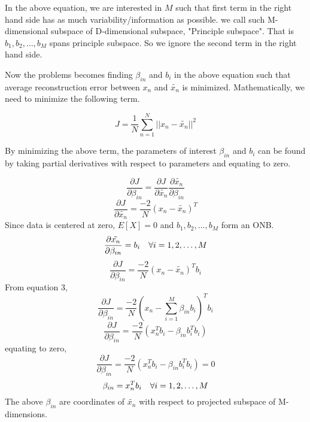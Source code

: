 \documentclass[11pt]{article}
\begin{document}
In the above equation, we are interested in $M$ such that first term in the right hand side has as much variability/information as possible.
we call such M-dimensional subspace of D-dimensional subspace, "Principle subspace". That is ${b_1, b_2, \dots, b_M}$ spans principle subspace. So we ignore the second term in the right hand side.

Now the problems becomes finding $\beta_{in}$ and $b_i$ in the above equation such that average reconstruction error between $x_n$ and $\tilde{x_n}$ is minimized.
Mathematically, we need to minimize the following term.

\begin{equation}
    J = \frac{1}{N} \sum_{n=1}^{N} ||x_n-\tilde{x_n}||^2 
\end{equation}

By minimizing the above term, the parameters of interest $\beta_{in}$ and $b_i$ can be found by taking partial derivatives with respect to parameters and equating to zero.

$$\frac{\partial{J}}{{\partial{\beta_{in}}}} = \frac{\partial{J}}{{\partial{\tilde{x_n}}}} \frac{\partial{\tilde{x_n}}}{{\partial{\beta_{in}}}}$$
$$\frac{\partial{J}}{{\partial{\tilde{x_n}}}} = \frac{-2}{N}(x_n-\tilde{x_n})^T$$
Since data is centered at zero, $E[X] = 0$ and $b_1, b_2, \dots, b_M$ form an ONB.
$$\frac{\partial{\tilde{x_n}}}{{\partial{\beta_{in}}}} = b_i \hspace{10px} \forall i =1,2,\dots,M $$
$$\frac{\partial{J}}{{\partial{\beta_{in}}}} = \frac{-2}{N}(x_n-\tilde{x_n})^T b_i$$
From equation 3,
$$\frac{\partial{J}}{{\partial{\beta_{in}}}} = \frac{-2}{N}(x_n-\sum_{i=1}^{M}\beta_{in}b_i)^T b_i$$
$$\frac{\partial{J}}{{\partial{\beta_{in}}}} = \frac{-2}{N}(x_n^Tb_i-\beta_{in}b_i^Tb_i)$$
equating to zero,
$$\frac{\partial{J}}{{\partial{\beta_{in}}}} = \frac{-2}{N}(x_n^Tb_i-\beta_{in}b_i^Tb_i) = 0$$
\begin{equation}
    \beta_{in} = x_n^Tb_i \hspace{10px} \forall i = 1, 2, \dots, M
\end{equation}
The above $\beta_{in}$ are coordinates of $\tilde{x_n}$ with respect to projected subspace of M-dimensions.
\end{document}
